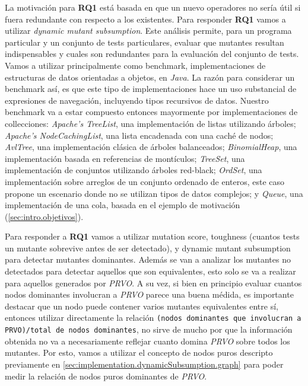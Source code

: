 La motivaci\'on para \textbf{RQ1} est\'a basada en que un nuevo operadores no ser\'ia \'util si fuera redundante con respecto a los existentes. Para responder \textbf{RQ1} vamos a utilizar \emph{dynamic mutant subsumption}. Este an\'alisis permite, para un programa particular y un conjunto de tests particulares, evaluar que mutantes resultan indispensables y cuales son redundantes para la evaluaci\'on del conjunto de tests. Vamos a utilizar principalmente como benchmark, implementaciones de estructuras de datos orientadas a objetos, en \emph{Java}. La raz\'on para considerar un benchmark as\'i, es que este tipo de implementaciones hace un uso substancial de expresiones de navegaci\'on, incluyendo tipos recursivos de datos. Nuestro benchmark va a estar compuesto entonces mayormente por implementaciones de collecciones:  \emph{Apache's TreeList}, una implementaci\'on de listas utilizando \'arboles; \emph{Apache's NodeCachingList}, una lista encadenada con una cach\'e de nodos; \emph{AvlTree}, una implementaci\'on cl\'asica de \'arboles balanceados; \emph{BinomialHeap}, una implementaci\'on basada en referencias de mont\'iculos; \emph{TreeSet}, una implementaci\'on de conjuntos utilizando \'arboles red-black; \emph{OrdSet}, una implementaci\'on sobre arreglos de un conjunto ordenado de enteros, este caso propone un escenario donde no se utilizan tipos de datos complejos; y \emph{Queue}, una implementaci\'on de una cola, basada en el ejemplo de motivaci\'on (\ref{sec:intro.objetivos}).

Para responder a \textbf{RQ1} vamos a utilizar mutation score, toughness (cuantos tests un mutante sobrevive antes de ser detectado), y dynamic mutant subsumption para detectar mutantes dominantes. Adem\'as se van a analizar los mutantes no detectados para detectar aquellos que son equivalentes, esto solo se va a realizar para aquellos generados por \emph{PRVO}. A su vez, si bien en principio evaluar cuantos nodos dominantes involucran a \emph{PRVO} parece una buena m\'edida, es importante destacar que un nodo puede contener varios mutantes equivalentes entre s\'i, entonces utilizar directamente la relaci\'on \texttt{(nodos dominantes que involucran a PRVO)/total de nodos dominantes}, no sirve de mucho por que la informaci\'on obtenida no va a necesariamente reflejar cuanto domina \emph{PRVO} sobre todos los mutantes. Por esto, vamos a utilizar el concepto de nodos puros descripto previamente en \ref{sec:implementation.dynamicSubsumption.graph} para poder medir la relaci\'on de nodos puros dominantes de \emph{PRVO}.

